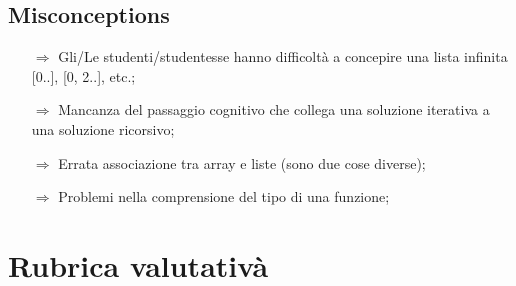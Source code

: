 \subsection{Misconceptions}

\begin{itemize}
    \item [$\Rightarrow$] Gli/Le studenti/studentesse hanno difficoltà a concepire una lista infinita [0..], [0, 2..], etc.;
    \item [$\Rightarrow$] Mancanza del passaggio cognitivo che collega una soluzione iterativa a una soluzione ricorsivo;
    \item [$\Rightarrow$] Errata associazione tra array e liste (sono due cose diverse);
    \item [$\Rightarrow$] Problemi nella comprensione del tipo di una funzione;
\end{itemize}

\section{Rubrica valutativà}

